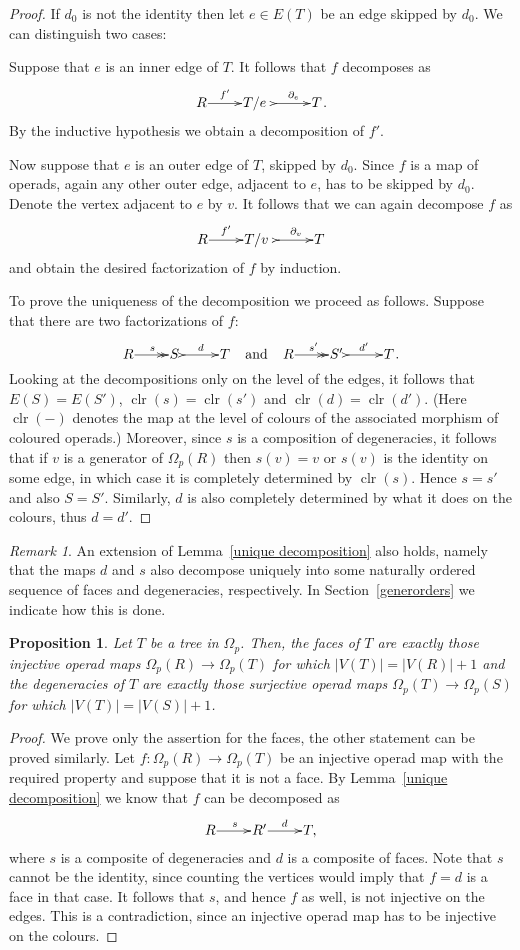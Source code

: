 \documentclass[a4paper]{amsart}
\theoremstyle{plain}
\newtheorem{prop}[thm]{Proposition}
\theoremstyle{definition}
\theoremstyle{remark}
\newtheorem{rem}[thm]{Remark}
\DeclareMathOperator{\clr}{clr}
\newcommand{\rpd}{\Omega_p}
\newcommand{\To}{\longrightarrow}
\numberwithin{equation}{section}
\numberwithin{figure}{section}
\begin{document}
\begin{proof}
If $d_0$ is not the identity then let $e\in E(T)$ be an edge skipped by $d_0$. We can distinguish two cases:

Suppose that $e$ is an inner edge of $T$. It follows that $f$ decomposes as
$$\xymatrix@1{R\ar[r]^-{f'}&T/e\ \ \ar@{>->}[r]^-{\partial_e}&T}.$$
By the inductive hypothesis we obtain a decomposition of $f'$.

Now suppose that $e$ is an outer edge of $T$, skipped by $d_0$. Since $f$ is a map of operads, again any other outer edge,
adjacent to $e$, has to be skipped by $d_0$. Denote the vertex adjacent to $e$ by $v$. It follows that we can again
decompose $f$ as
$$
\xymatrix@1{R\ar[r]^-{f'}&T/v\ \ \ar@{>->}[r]^-{\partial_v}&T}
$$
and obtain the desired factorization of $f$ by induction.

To prove the uniqueness of the decomposition we proceed as follows. Suppose that there are two factorizations of $f$:
$$
\xymatrix@1{R\ar@{->>}[r]^s&S\ \ar@{>->}[r]^d &T} \ \ \ \mbox{and}\ \ \  \xymatrix@1{R\ar@{->>}[r]^{s'}&S'\
\ar@{>->}[r]^{d'} &T}.
$$
Looking at the decompositions only on the level of the edges, it
follows that $E(S)=E(S')$, $\clr(s)=\clr(s')$ and
$\clr(d)=\clr(d')$. (Here $\clr(-)$ denotes the map at the level of
colours of the associated morphism of coloured operads.) Moreover,
since $s$ is a composition of degeneracies, it follows that if $v$
is a generator of $\Omega_p(R)$ then $s(v)=v$ or $s(v)$ is the
identity on some edge, in which case it is completely determined by
$\clr(s)$. Hence $s=s'$ and also $S=S'$. Similarly, $d$ is also
completely determined by what it does on the colours, thus $d=d'$.
\end{proof}

\begin{rem}
An extension of Lemma~\ref{unique decomposition} also holds, namely that the maps $d$ and $s$ also decompose uniquely into some naturally
ordered sequence of faces and degeneracies, respectively. In Section~\ref{generorders} we indicate how this is done.
\end{rem}

\begin{prop}\label{prop:allmonic}
Let $T$ be a tree in $\rpd$. Then, the faces of $T$ are exactly those injective operad maps $\Omega_p(R)\To\Omega_p(T)$
for which $|V(T)|=|V(R)|+1$ and the degeneracies of $T$ are exactly those surjective operad maps $\Omega_p(T)\To \Omega_p(S)$ for which
$|V(T)|=|V(S)|+1$.
\end{prop}
\begin{proof} We prove only the assertion for the faces, the other statement can be proved similarly.
Let $f\colon \Omega_p(R)\To \Omega_p(T)$ be an injective operad map with the required property and suppose that it is not a face.
By Lemma~\ref{unique decomposition} we know that $f$ can be decomposed as
\[
\xymatrix@1{R\ar[r]^s &R'\ar[r]^d &T,}
\]
where $s$ is a composite of degeneracies and $d$ is a composite of faces. Note that $s$ cannot be the identity, since counting the vertices would imply that $f=d$ is a face in that case. It follows that $s$, and hence $f$ as well, is not injective on the edges. This is a contradiction, since an injective operad map has to be injective on the colours.
\end{proof}
\end{document}
